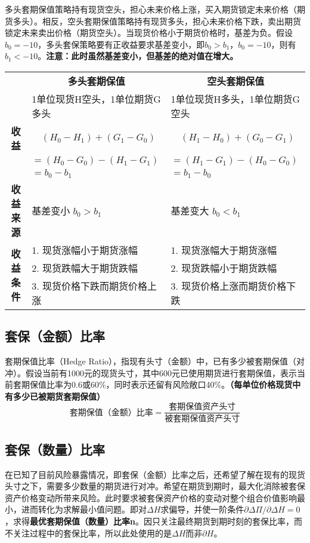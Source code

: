\documentclass[11pt]{article}
\begin{document}
多头套期保值策略持有现货空头，担心未来价格上涨，买入期货锁定未来价格（期货多头）。相反，空头套期保值策略持有现货多头，担心未来价格下跌，卖出期货锁定未来卖出价格（期货空头）。当现货价格小于期货价格时，基差为负。假设$b_0=-10$，多头套保策略要有正收益要求基差变小，即$b_0>b_1$，$b_0=-10$，则有$b_1< -10$。\textbf{注意：此时虽然基差变小，但基差的绝对值在增大。}
\begin{table}[H]
\centering
\begin{tabular}{@{}cll@{}}
\toprule
\multicolumn{1}{l}{}           
& \multicolumn{1}{c}{\textbf{多头套期保值}} & \multicolumn{1}{c}{\textbf{空头套期保值}} \\
& 1单位现货H空头，1单位期货G多头 & 1单位现货H多头，1单位期货G空头 \\
\midrule
\textbf{收益} &$\quad(H_0 - H_1) + (G_1 - G_0)$ & $\quad(H_1 - H_0) + (G_0 - G_1)$ \\
& $=(H_0 - G_0) - (H_1 - G_1)$ & $=(H_1 - G_1) - (H_0 - G_0)$ \\
& $=b_0 - b_1$ & $=b_1 - b_0$ \\
\textbf{收益来源} & 基差变小 $b_0>b_1$ & 基差变大 $b_0<b_1$\\
\multirow{3}{*}{\textbf{收益条件}} & 1. 现货涨幅小于期货涨幅 & 1. 现货涨幅大于期货涨幅 \\
& 2. 现货跌幅大于期货跌幅 & 2. 现货跌幅小于期货跌幅 \\ 
& 3. 现货价格下跌而期货价格上涨 & 3. 现货价格上涨而期货价格下跌 \\
\bottomrule
\end{tabular}
\end{table}

\subsection{套保（金额）比率}
套期保值比率（Hedge Ratio），指现有头寸（金额）中，已有多少被套期保值（对冲）。假设当前有1000元的现货头寸，其中600元已使用期货进行套期保值，表示当前套期保值比率为0.6或60\%，同时表示还留有风险敞口40\%。\textbf{（每单位价格现货中有多少已被期货套期保值）}
\begin{equation*}
   \text{套期保值（金额）比率} = \frac{\text{套期保值资产头寸}}{\text{被套期保值资产头寸}}
\end{equation*}

\subsection{套保（数量）比率}
在已知了目前风险暴露情况，即套保（金额）比率之后，还希望了解在现有的现货头寸之下，需要多少数量的期货进行对冲。希望在期货到期时，最大化消除被套保资产价格变动所带来风险。此时要求被套保资产价格的变动对整个组合价值影响最小，进而转化为求解最小值问题。即对$\Delta H$求偏导，并使一阶条件$\partial\Delta\Pi / \partial \Delta H = 0$，求得\textbf{最优套期保值（数量）比率n}。因只关注最终期货到期时刻的套保比率，而不关注过程中的套保比率，所以此处使用的是$\Delta H$而非$\partial H$。
\end{document}
